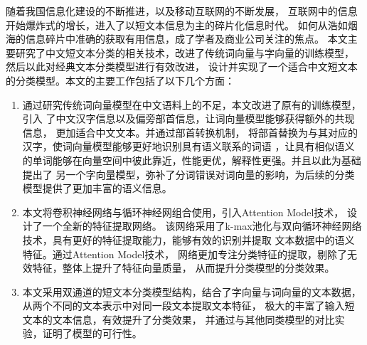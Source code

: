 \documentclass{standalone}
\begin{document}
\begin{chineseabstract}
随着我国信息化建设的不断推进，以及移动互联网的不断发展，
互联网中的信息开始爆炸式的增长，进入了以短文本信息为主的碎片化信息时代。
如何从浩如烟海的信息碎片中准确的获取有用信息，成了学者及商业公司关注的焦点。
本文主要研究了中文短文本分类的相关技术，改进了传统词向量与字向量的训练模型，
然后以此对经典文本分类模型进行有效改进，
设计并实现了一个适合中文短文本的分类模型。本文的主要工作包括了以下几个方面：
\begin{enumerate}
    \item 通过研究传统词向量模型在中文语料上的不足，本文改进了原有的训练模型，引入
    了中文汉字信息以及偏旁部首信息，让词向量模型能够获得额外的共现信息，
    更加适合中文文本。并通过部首转换机制，
    将部首替换为与其对应的汉字，使词向量模型能够更好地识别具有语义联系的词语
    ，让具有相似语义的单词能够在向量空间中彼此靠近，性能更优，解释性更强。并且以此为基础提出了
    另一个字向量模型，弥补了分词错误对词向量的影响，为后续的分类模型提供了更加丰富的语义信息。
    \item 本文将卷积神经网络与循环神经网组合使用，引入Attention Model技术，
    设计了一个全新的特征提取网络。
    该网络采用了k-max池化与双向循环神经网络技术，具有更好的特征提取能力，能够有效的识别并提取
    文本数据中的语义特征。通过Attention Model技术，
    网络更加专注分类特征的提取，剔除了无效特征，整体上提升了特征向量质量，
    从而提升分类模型的分类效果。
    \item 本文采用双通道的短文本分类模型结构，结合了字向量与词向量的文本数据，
    从两个不同的文本表示中对同一段文本提取文本特征，
    极大的丰富了输入短文本的文本信息，有效提升了分类效果，
    并通过与其他同类模型的对比实验，证明了模型的可行性。
\end{enumerate}


\end{chineseabstract}
\end{document}
